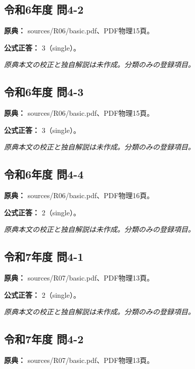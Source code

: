 \subsection{令和6年度 問4-2}
\label{q:r06-reg-basic-4-2}

\noindent\textbf{原典：} sources/R06/basic.pdf、PDF物理15頁。

\textbf{公式正答：} 3（single）。

\par\textit{原典本文の校正と独自解説は未作成。分類のみの登録項目。}

\subsection{令和6年度 問4-3}
\label{q:r06-reg-basic-4-3}

\noindent\textbf{原典：} sources/R06/basic.pdf、PDF物理15頁。

\textbf{公式正答：} 3（single）。

\par\textit{原典本文の校正と独自解説は未作成。分類のみの登録項目。}

\subsection{令和6年度 問4-4}
\label{q:r06-reg-basic-4-4}

\noindent\textbf{原典：} sources/R06/basic.pdf、PDF物理16頁。

\textbf{公式正答：} 2（single）。

\par\textit{原典本文の校正と独自解説は未作成。分類のみの登録項目。}

\subsection{令和7年度 問4-1}
\label{q:r07-reg-basic-4-1}

\noindent\textbf{原典：} sources/R07/basic.pdf、PDF物理13頁。

\textbf{公式正答：} 2（single）。

\par\textit{原典本文の校正と独自解説は未作成。分類のみの登録項目。}

\subsection{令和7年度 問4-2}
\label{q:r07-reg-basic-4-2}

\noindent\textbf{原典：} sources/R07/basic.pdf、PDF物理13頁。

